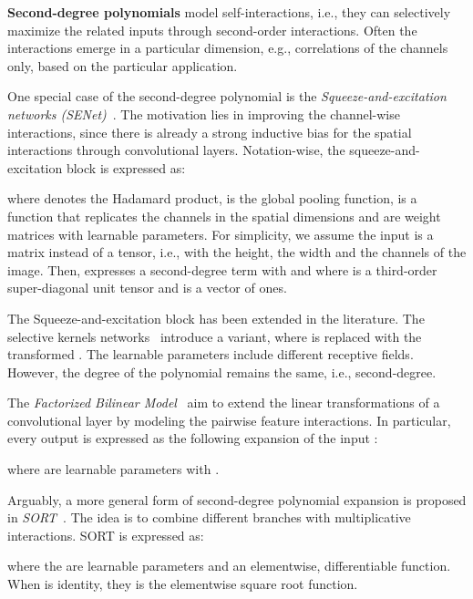 \documentclass[runningheads]{llncs}
\newcommand{\sne}{SENet}
\providecommand\eg{e.g.,}
\providecommand\ie{i.e.,}
\begin{document}
\noindent\textbf{Second-degree polynomials} model self-interactions, \ie{} they can selectively maximize the related inputs through second-order interactions. 
Often the interactions emerge in a particular dimension, \eg{} correlations of the channels only, based on the particular application. 

One special case of the second-degree polynomial is the \emph{Squeeze-and-excitation networks (\sne)}~\cite{hu2018squeeze}. The motivation lies in improving the channel-wise interactions, since there is already a strong inductive bias for the spatial interactions through convolutional layers. Notation-wise, the squeeze-and-excitation block is expressed as:

where  denotes the Hadamard product,  is the global pooling function,  is a function that replicates the channels in the spatial dimensions and  are weight matrices with learnable parameters. For simplicity, we assume the input is a matrix instead of a tensor, \ie{}  with  the height,  the width and  the channels of the image. 
Then,  expresses a second-degree term with  and  where  is a third-order super-diagonal unit tensor and  is a vector of ones. 





The Squeeze-and-excitation block has been extended in the literature. The selective kernels networks~\cite{li2019selective} introduce a variant, where  is replaced with the transformed . The learnable parameters  include different receptive fields. However, the degree of the polynomial remains the same, \ie{} second-degree.

The \emph{Factorized Bilinear Model}~\cite{li2017factorized} aim to extend the linear transformations of a convolutional layer by modeling the pairwise feature interactions. In particular, every output  is expressed as the following expansion of the input :

where  are learnable parameters with .

Arguably, a more general form of second-degree polynomial expansion is proposed in \emph{SORT}~\cite{wang2017sort}. The idea is to combine different branches with multiplicative interactions. SORT is expressed as: 

where the  are learnable parameters and  an elementwise, differentiable function. When  is identity, they  is the elementwise square root function. 
\end{document}
